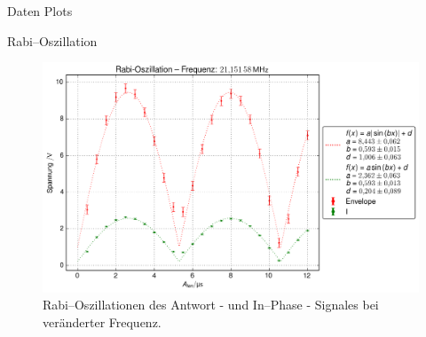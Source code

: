 \begin{appendix}
\begin{chapter}{Daten Plots}
\begin{section}{Rabi--Oszillation}
\begin{figure}[htb]
        \begin{minipage}{.48\textwidth}
          \centering
          \includegraphics[width=\textwidth]{Figures/Rabi_freq2.png}
          \caption{Rabi--Oszillationen des Antwort - und In--Phase - Signales
            bei veränderter Frequenz.}
          \label{AnhangfigRabi2}
        \end{minipage}
      \end{figure}
      
    \end{section}
    

\end{chapter}
\end{appendix}

